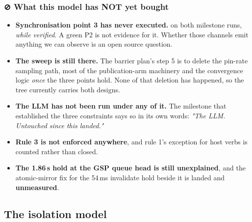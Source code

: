 \documentclass[10.5pt]{article}
\begin{document}
\subsubsection*{⊘ What this model has NOT yet bought}

\begin{itemize}\small
\item \textbf{Synchronisation point 3 has never executed.}  on both
  milestone runs, \emph{while  verified}. A green P2 is not evidence for it.
  Whether those channels emit anything we can observe is an open source question.
\item \textbf{The sweep is still there.} The barrier plan's step 5 is to delete the pin-rate
  sampling path, most of the publication-arm machinery and the convergence logic \emph{once} the
  three points hold. None of that deletion has happened, so the tree currently carries both
  designs.
\item \textbf{The LLM has not been run under any of it.} The milestone that established the three
  constraints says so in its own words: \emph{"The LLM. Untouched since this landed."}
\item \textbf{Rule 3 is not enforced anywhere}, and rule 1's exception for host verbs is counted
  rather than closed.
\item \textbf{The 1.86\,s hold at the GSP queue head is still unexplained}, and the atomic-mirror
  fix for the 54\,ms invalidate hold beside it is landed and \textbf{unmeasured}.
\end{itemize}

\subsection{The isolation model}
\end{document}

